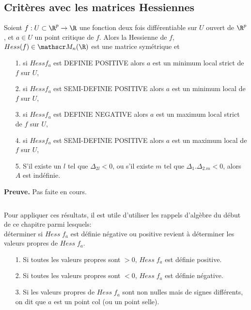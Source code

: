 \documentclass[12pt, class=report,crop=false]{standalone}
\begin{document}
{\subsection{Critères avec les matrices Hessiennes}



\begin{theoreme}
\textcolor[rgb]{0.44,0.00,0.87}{
   Soient $f:U \subset \R^p \rightarrow \R$ une fonction deux fois différentiable sur $U$ ouvert de $\R^p$, et $a \in U$ un point critique de $f$.
 Alors la Hessienne de $f$,  $Hess(f) \in \mat_n(\R)$ est une matrice symétrique et 
 \begin{itemize}
 \item[1.]si $Hess f_a$ est DEFINIE POSITIVE alors $a$ est un minimum local strict de $f$ sur $U$,
 \item[2.] si $Hess f_a$ est SEMI-DEFINIE POSITIVE alors $a$ est un minimum local  de $f$ sur $U$,
 \item[3.]si $Hess f_a$ est DEFINIE NEGATIVE alors $a$ est un maximum local strict de $f$ sur $U$,
 \item[4.] si $Hess f_a$ est SEMI-DEFINIE POSITIVE alors $a$ est un maximum local  de $f$ sur $U$,
 \item[5.] S'il existe un $l$ tel que $\Delta_{2l} <0$, ou s'il existe $m$ tel que $\Delta_1.\Delta_{2.m}<0$, alors $A$ est indéfinie.
 \end{itemize}}
\end{theoreme}

{\textbf{Preuve.}} Pas faite en cours.

\begin{remarque*} $ $\\
\textcolor[rgb]{0.00,0.00,1.00}{
Pour appliquer ces résultats, il est utile d'utiliser les rappels d'algèbre du début de ce chapitre parmi lesquels: \\
  d\'eterminer si $Hess \; f_a$ est d\'efinie n\'egative ou positive revient \`a d\'eterminer
  les valeurs propres de $Hess \; f_a$.
  \begin{itemize}
    \item[1.] Si toutes les valeurs propres sont $>0$, $Hess \; f_a$ est d\'efinie positive.
    \item[2.] Si toutes les valeurs propres sont $<0$, $Hess \; f_a$ est d\'efinie n\'egative.
    \item[3.] Si les valeurs propres de $Hess \; f_a$ sont non nulles mais de signes diff\'erents, on dit que
    $a$ est un point col (ou un point selle).
  \end{itemize}}
\end{remarque*}

}
\end{document}
